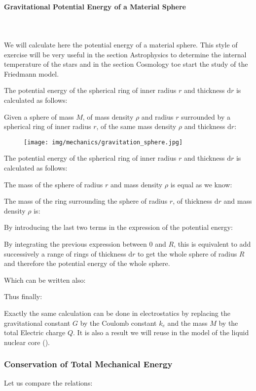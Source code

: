 	\paragraph{Gravitational Potential Energy of a Material Sphere}\mbox{}\\\\
	We will calculate here the potential energy of a material sphere. This style of exercise will be very useful in the section Astrophysics to determine the internal temperature of the stars and in the section Cosmology toe start the study of the Friedmann model.

	The potential energy of the spherical ring of inner radius $r$ and thickness $\mathrm{d}r$ is calculated as follows:
	
	Given a sphere of mass $M$, of mass density $\rho$ and radius $r$ surrounded by a spherical ring of inner radius $r$, of the same mass density $\rho$ and thickness $\mathrm{d}r$:
	\begin{figure}[H]
		\centering
		\texttt{[image: img/mechanics/gravitation\_sphere.jpg]}
	\end{figure}
	The potential energy of the spherical ring of inner radius $r$ and thickness $\mathrm{d}r$ is calculated as follows:

	The mass of the sphere of radius $r$ and mass density $\rho$ is equal as we know:
	
	The mass of the ring surrounding the sphere of radius $r$, of thickness $\mathrm{d}r$ and mass density $\rho$ is:
	
	By introducing the last two terms in the expression of the potential energy:
	
	By integrating the previous expression between $0$ and $R$, this is equivalent to add successively a range of rings of thickness $\mathrm{d}r$ to get the whole sphere of radius $R$ and therefore the potential energy of the whole sphere.
	
	Which can be written also:
	
	Thus finally:
	
	Exactly the same calculation can be done in electrostatics by replacing the gravitational constant $G$ by the Coulomb constant $k_e$  and the mass $M$ by the total Electric charge $Q$. It is also a result we will reuse in the model of the liquid nuclear core ().
	 
	\subsubsection{Conservation of Total Mechanical Energy}
	Let us compare the relations:
	
